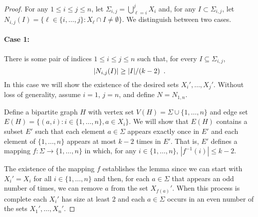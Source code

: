 \documentclass{llncs}
\begin{document}
\begin{proof}
   For any $1\le i\le j\le n$, let $\Sigma_{i,j}=\bigcup_{\ell=i}^j
   X_i$ and, for any $I\subset\Sigma_{i,j}$, let
   $N_{i,j}(I)=\{\ell\in\{i,\ldots,j\}: X_\ell\cap I\neq\emptyset \}$.
   We distinguish between two cases.

   \paragraph{Case 1:}
   There is some pair of indices $1\le i\le j\le n$ such that, for every
   $I\subseteq\Sigma_{i,j}$, 
   \begin{equation}
       |N_{i,j}(I)| \ge |I|/(k-2) \enspace . \eqlabel{hall}
   \end{equation}
   In this case
   we will show the existence of the desired sets $X_{i}',\ldots,X_{j}'$.
   Without loss of generality, assume $i=1$, $j=n$, and define $N=N_{1,n}$.

   Define a bipartite graph $H$ with vertex
   set $V(H)=\Sigma\cup\{1,\ldots,n\}$ and edge set $E(H)=\{(a,i):
   i\in\{1,\ldots,n\}, a\in X_i\}$.  We will show that $E(H)$ contains a
   subset $E'$ such that each element $a\in\Sigma$ appears exactly once in
   $E'$ and each element of $\{1,\ldots,n\}$ appears at most $k-2$ times
   in $E'$.  That is, $E'$ defines a mapping $f:\Sigma\to\{1,\ldots,n\}$
   in which, for any $i\in\{1,\ldots,n\}$, $|f^{-1}(i)|\le k-2$.

   The existence of the mapping $f$ establishes the lemma since we can
   start with $X_i'=X_i$ for all $i\in\{1,\ldots,n\}$ and then, for each
   $a\in\Sigma$ that appears an odd number of times, we can remove $a$
   from the set $X_{f(a)}'$.  When this process is complete each $X_i'$
   has size at least 2 and each $a\in\Sigma$ occurs in an even number
   of the sets $X_1',\ldots,X_n'$.


\end{proof}
\end{document}
